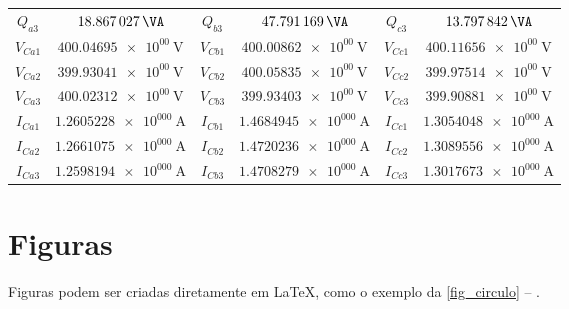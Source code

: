 \begin{table}[!ht]
{\begin{tabular}{cc|cc|cc}
            $Q_{a3}$                             & $\SI{18.867027e+00}{\VA}$           & $Q_{b3}$  & $\SI{47.791169e+00}{\VA}$ & $Q_{c3}$  & $\SI{13.797842e+00}{\VA}$ \\
            $V_{Ca1}$                            & $\SI{400.04695e+00}{\V}$            & $V_{Cb1}$ & $\SI{400.00862e+00}{\V}$  & $V_{Cc1}$ & $\SI{400.11656e+00}{\V}$  \\
            $V_{Ca2}$                            & $\SI{399.93041e+00}{\V}$            & $V_{Cb2}$ & $\SI{400.05835e+00}{\V}$  & $V_{Cc2}$ & $\SI{399.97514e+00}{\V}$  \\
            $V_{Ca3}$                            & $\SI{400.02312e+00}{\V}$            & $V_{Cb3}$ & $\SI{399.93403e+00}{\V}$  & $V_{Cc3}$ & $\SI{399.90881e+00}{\V}$  \\
            $I_{Ca1}$                            & $\SI{1.2605228e+000}{\A}$           & $I_{Cb1}$ & $\SI{1.4684945e+000}{\A}$ & $I_{Cc1}$ & $\SI{1.3054048e+000}{\A}$ \\
            $I_{Ca2}$                            & $\SI{1.2661075e+000}{\A}$           & $I_{Cb2}$ & $\SI{1.4720236e+000}{\A}$ & $I_{Cc2}$ & $\SI{1.3089556e+000}{\A}$ \\
            $I_{Ca3}$                            & $\SI{1.2598194e+000}{\A}$           & $I_{Cb3}$ & $\SI{1.4708279e+000}{\A}$ & $I_{Cc3}$ & $\SI{1.3017673e+000}{\A}$ \\
            \bottomrule
        \end{tabular}}
\end{table}


\clearpage
\section{Figuras}

Figuras podem ser criadas diretamente em \LaTeX{},
como o exemplo da \autoref{fig_circulo} -- \showfont.

